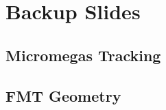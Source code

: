 \section*{}
\begin{frame}{}
    \centering \Huge{}
\end{frame}

\section*{Backup Slides}
\subsection*{Micromegas Tracking}


\subsection*{FMT Geometry}


% 

% 

% 

% 

% 

% 

